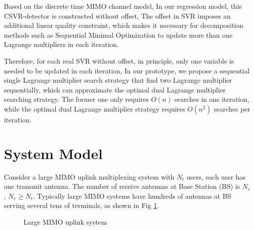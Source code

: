 \documentclass[12pt, draftclsnofoot, onecolumn]{IEEEtran}
\begin{document}
\begin{spacing}{2}
Based on the discrete time MIMO channel model, In our regression model, this CSVR-detector is constructed without offset, The offset in SVR imposes an additional linear quality constraint, which makes it necessary for decomposition methods such as Sequential Minimal Optimization to update more than one Lagrange multipliers in each iteration.

Therefore, for each real SVR without offset, in principle, only one variable is needed to be updated in each iteration, In our prototype, we propose a sequential single Lagrange multiplier search strategy that find two Lagrange multiplier sequentially, which can approximate the optimal dual Lagrange multiplier searching strategy. The former one only requires $O(n)$ searches in one iteration, while the optimal dual Lagrange multiplier strategy requires $O(n^{2})$ searches per iteration.  


\section{System Model}\label{system model}
  Consider a large MIMO uplink multiplexing system with $N_{t}$ users, each user has one transmit antenna. The number of receive antennas at Base Station (BS) is $N_{r}$, $N_{r}\geq N_{t}$. Typically large MIMO systems have hundreds of antennas at BS serving several tens of terminals, as shown in Fig {\ref{large MIMO uplink model}}.
  \begin{figure}
  \centering
  \def\svgwidth{\columnwidth}
  
  \caption{Large MIMO uplink system }
  \label{large MIMO uplink model}
  \end{figure}
    

\end{spacing}
\end{document}
